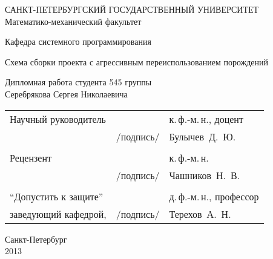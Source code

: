 %
%
\thispagestyle{empty}
\begin{center}
САНКТ-ПЕТЕРБУРГСКИЙ ГОСУДАРСТВЕННЫЙ УНИВЕРСИТЕТ\\
Математико-механический факультет\\
\end{center}

\begin{center}
Кафедра системного программирования\\
\end{center}
\vspace{2cm}
\begin{center}
    \LARGE{Схема сборки проекта с агрессивным переиспользованием порождений} \\
\end{center}
\vspace{1cm}
\begin{center}
    \normalsize{Дипломная работа студента 545 группы} \\
    \large{Серебрякова Сергея Николаевича}
\end{center}
\vspace{3cm}
\noindent
\begin{center}
    \small
    \begin{tabular}{lcl}
        Научный руководитель & \dotuline{\phantom{место для подписи}} & к.\,ф.-м.\,н., доцент\\
        & /подпись/ & Булычев~Д.~Ю.\\\\
        Рецензент & \dotuline{\phantom{место для подписи}} & к.\,ф.-м.\,н.\\
        & /подпись/& Чашников~Н.~В.\\\\
        ``Допустить к защите'' & \dotuline{\phantom{место для подписи}} & д.\,ф.-м.\,н., профессор\\
        заведующий кафедрой, & /подпись/& Терехов~А.~Н.\\
    \end{tabular}
\end{center}
\vspace{\fill}
\begin{center}
    \small
    Санкт-Петербург\\2013
\end{center}
